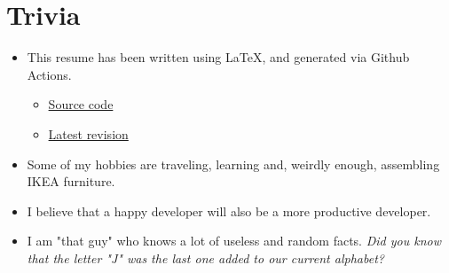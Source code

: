 \documentclass{article}
\begin{document}
{	\section*{Trivia}
	\begin{itemize}
		\item This resume has been written using \LaTeX, and generated via Github Actions.
		\begin{itemize}
			\item \textcolor{Green}{\href{https://github.com/Kyngo/Resume}{Source code}}
			\item \textcolor{Green}{\href{https://github.com/Kyngo/Resume/releases/latest}{Latest revision}}
		\end{itemize}
		\item Some of my hobbies are traveling, learning and, weirdly enough, assembling IKEA furniture.
		\item I believe that a happy developer will also be a more productive developer.
		\item I am "that guy" who knows a lot of useless and random facts. \textit{Did you know that the letter "J" was the last one added to our current alphabet?}
	\end{itemize}
	
}
\end{document}
